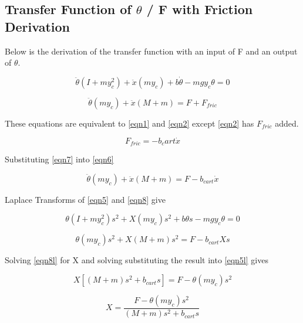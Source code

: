 \documentclass{article}
\begin{document}
\subsection{Transfer Function of $\theta$ / F with Friction Derivation}

Below is the derivation of the transfer function with an input of F and an output of $\theta$.

\begin{equation} 
\label{eqn5}
\ddot \theta (I+m y_c^2)+\ddot x (m y_c)+b \dot \theta - m g y_c \theta = 0 
\end{equation}

\begin{equation} 
\label{eqn6}
\ddot \theta(m y_c) + \ddot x(M+m) = F+ F_{fric}
\end{equation}

These equations are equivalent to \ref{eqn1} and \ref{eqn2} except \ref{eqn2} has $F_{fric}$ added.

\begin{equation}
\label{eqn7}
F_{fric} = - b_cart \dot x
\end{equation}

Substituting \ref{eqn7} into \ref{eqn6}

\begin{equation} 
\label{eqn8}
\ddot \theta(m y_c) + \ddot x(M+m) = F - b_{cart} \dot x
\end{equation}

Laplace Transforms of \ref{eqn5} and \ref{eqn8} give

\begin{equation} 
\label{eqn5l}
\theta (I+m y_c^2) s^2+ X (m y_c) s^2+b \theta s - m g y_c \theta = 0 
\end{equation}

\begin{equation} 
\label{eqn8l}
\theta (m y_c) s^2+ X (M+m) s^2= F - b_{cart} X s
\end{equation}

Solving \ref{eqn8l} for X and solving substituting the result into \ref{eqn5l} gives

\begin{equation} 
\label{eqn8lb}
X [(M+m) s^2 + b_{cart} s]= F - \theta(m y_c) s^2
\end{equation}

\begin{equation} 
\label{eqn8lc}
X = \frac{F - \theta(m y_c) s^2}{(M+m) s^2 + b_{cart} s}
\end{equation}
\end{document}
